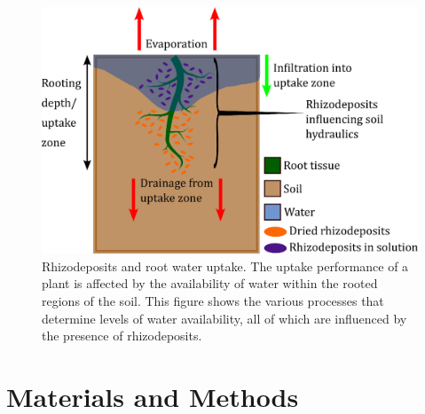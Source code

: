 \documentclass[11pt,a4paper]{article}
\numberwithin{equation}{section}
\begin{document}
\begin{figure}
	\centering
	\includegraphics[width = 0.75\linewidth, keepaspectratio]{concept_figure_10_10_24.eps}
	\caption{Rhizodeposits and root water uptake. The uptake performance of a plant is affected by the availability of water within the rooted regions of the soil. This figure shows the various processes that determine levels of water availability, all of which are influenced by the presence of rhizodeposits.}
	\label{figure: processes}
\end{figure}

\section{Materials and Methods}
\end{document}
